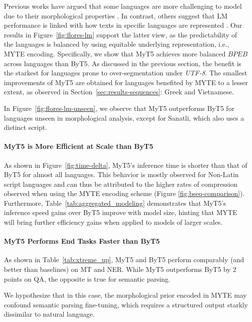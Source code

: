 Previous works have argued that some languages are more challenging to model due to their morphological properties \cite{cotterell_are_2018}. In contrast, others suggest that LM performance is linked with how texts in specific languages are represented \cite{park_morphology_2021}. Our results in Figure~\ref{fig:flores-lm} support the latter view, as the predictability of the languages is balanced by using equitable underlying representation, i.e., \textsc{MYTE} encoding. Specifically, we show that MyT5 achieves more balanced $BPEB$ across languages than ByT5. As discussed in the previous section, the benefit is the starkest for languages prone to over-segmentation under \emph{UTF-8}.
The smallest improvements of MyT5 are obtained for languages benefited by \textsc{MYTE} to a lesser extent, as observed in Section~\ref{sec:results-sequences}: Greek and Vietnamese. 

In Figure~\ref{fig:flores-lm-unseen}, we observe that MyT5 outperforms ByT5 for languages unseen in morphological analysis, except for Sanatli, which also uses a distinct script. 

\paragraph{MyT5 is More Efficient at Scale than ByT5} As shown in Figure~\ref{fig:time-delta}, MyT5's inference time is shorter than that of ByT5 for almost all languages. This behavior is mostly observed for Non-Latin script languages and can thus be attributed to the higher rates of compression observed when using the \textsc{MYTE} encoding scheme (Figure \ref{fig:bseq-comparison}).
Furthermore, Table~\ref{tab:aggregated_modeling} demonstrates that MyT5's inference speed gains over ByT5 improve with model size, hinting that \textsc{MYTE} will bring further efficiency gains when applied to models of larger scales.

\paragraph{MyT5 Performs End Tasks Faster than ByT5}

As shown in Table~\ref{tab:xtreme_up}, MyT5 and ByT5 perform comparably (and better than baselines) on MT and NER. While MyT5 outperforms ByT5 by 2 points on QA, the opposite is true for semantic parsing.

We hypothesize that in this case, the morphological prior encoded in \textsc{MYTE} may confound semantic parsing fine-tuning, which requires a structured output starkly dissimilar to natural language.

